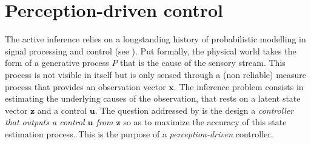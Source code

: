 \documentclass{article} %
\begin{document}

\section{Perception-driven control}
The active inference relies on a longstanding history of probabilistic modelling in signal processing and control (see \cite{Kalman1960,Baum1966,friston1994statistical}).  Put formally, the physical world  takes the form of a generative process $P$ that is the cause of the sensory stream. This process is not visible in itself but is only sensed through a (non reliable) measure process that provides an observation vector $\boldsymbol{x}$. The inference problem consists in estimating the underlying causes of the observation, that rests on a latent state vector $\boldsymbol{z}$ and a control $\boldsymbol{u}$. 
The question addressed by \cite{friston2012perceptions} is the design a \emph{controller} \emph{that outputs a control $\boldsymbol{u}$ from $\boldsymbol{z}$} so as to maximize the accuracy of this state estimation process. This is the purpose of a \emph{perception-driven} controller.
\end{document}
